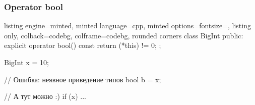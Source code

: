 \documentclass[10pt]{beamer}
\begin{document}
\begin{frame}[fragile]
\frametitle{Operator bool}
\begin{tcblisting}{listing engine=minted, minted language=cpp, minted options={fontsize=\scriptsize}, listing only, colback=codebg, colframe=codebg, rounded corners}
class BigInt {
public:
  explicit operator bool() const {
    return (*this) != 0;
  }
};

BigInt x = 10;

// Ошибка: неявное приведение типов
bool b = x;

// А тут можно :)
if (x) {
  ...
}
\end{tcblisting}
\end{frame}
\end{document}

